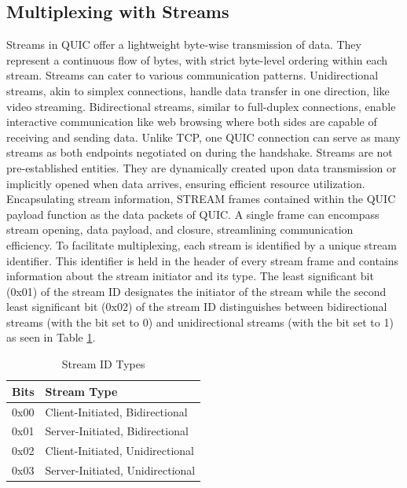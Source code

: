 \subsection{Multiplexing with Streams} \label{multiplexing_w_streams}

Streams in QUIC offer a lightweight byte-wise transmission of data. They represent a continuous flow of bytes, with strict byte-level ordering within each stream. Streams can cater to various communication patterns. Unidirectional streams, akin to simplex connections, handle data transfer in one direction, like video streaming. Bidirectional streams, similar to full-duplex connections, enable interactive communication like web browsing where both sides are capable of receiving and sending data. Unlike TCP, one QUIC connection can serve as many streams as both endpoints negotiated on during the handshake. Streams are not pre-established entities. They are dynamically created upon data transmission or implicitly opened when data arrives, ensuring efficient resource utilization. Encapsulating stream information, STREAM frames contained within the QUIC payload function as the data packets of QUIC. A single frame can encompass stream opening, data payload, and closure, streamlining communication efficiency. To facilitate multiplexing, each stream is identified by a unique stream identifier. This identifier is held in the header of every stream frame and contains information about the stream initiator and its type. The least significant bit (0x01) of the stream ID designates the initiator of the stream while the second least significant bit (0x02) of the stream ID distinguishes between bidirectional streams (with the bit set to 0) and unidirectional streams (with the bit set to 1) as seen in Table \ref{table_stream_id_types}.

\begin{table}[H]
\begin{center}
    \begin{tabular}{| l | l |}
    \hline
    Bits & Stream Type \\ \hline
    0x00 & Client-Initiated, Bidirectional \\ \hline
    0x01 & Server-Initiated, Bidirectional \\ \hline
    0x02 & Client-Initiated, Unidirectional \\ \hline
    0x03 & Server-Initiated, Unidirectional \\ \hline
    \end{tabular}
\end{center}
\caption{Stream ID Types \cite[Tab. 1]{rfc9000}}
\label{table_stream_id_types}
\end{table}

